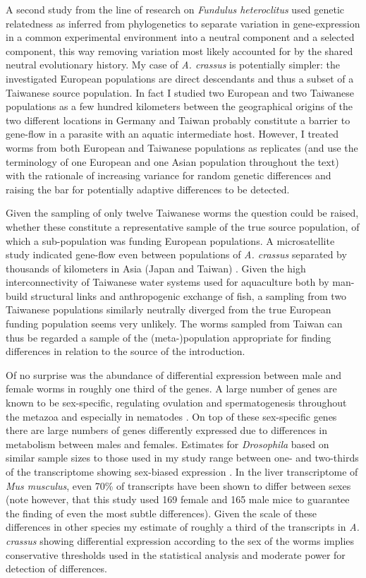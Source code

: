 A second study from the line of research on \textit{Fundulus
  heteroclitus} \cite{pmid16567645} used genetic relatedness as
inferred from phylogenetics to separate variation in gene-expression
in a common experimental environment into a neutral component and a
selected component, this way removing variation most likely accounted
for by the shared neutral evolutionary history. My case of
\textit{A. crassus} is potentially simpler: the investigated European
populations are direct descendants and thus a subset of a Taiwanese
source population. In fact I studied two European and two Taiwanese
populations as a few hundred kilometers between the geographical
origins of the two different locations in Germany and Taiwan probably
constitute a barrier to gene-flow in a parasite with an aquatic
intermediate host. However, I treated worms from both European and
Taiwanese populations as replicates (and use the terminology of one
European and one Asian population throughout the text) with the
rationale of increasing variance for random genetic differences and
raising the bar for potentially adaptive differences to be detected.

Given the sampling of only twelve Taiwanese worms the question could
be raised, whether these constitute a representative sample of the
true source population, of which a sub-population was funding European
populations. A microsatellite study indicated gene-flow even between
populations of \textit{A. crassus} separated by thousands of
kilometers in Asia (Japan and Taiwan)
\cite{wielgoss_population_2008}. Given the high interconnectivity of
Taiwanese water systems used for aquaculture both by man-build
structural links and anthropogenic exchange of fish, a sampling from
two Taiwanese populations similarly neutrally diverged from the true
European funding population seems very unlikely. The worms sampled
from Taiwan can thus be regarded a sample of the (meta-)population
appropriate for finding differences in relation to the source of the
introduction.

Of no surprise was the abundance of differential expression between
male and female worms in roughly one third of the genes. A large
number of genes are known to be sex-specific, regulating ovulation and
spermatogenesis throughout the metazoa and especially in nematodes
\cite{pmid15371532}. On top of these sex-specific genes there are
large numbers of genes differently expressed due to differences in
metabolism between males and females. Estimates for
\textit{Drosophila} based on similar sample sizes to those used in my
study range between one- and two-thirds of the transcriptome showing
sex-biased expression \cite{pmid11726925}. In the liver transcriptome
of \textit{Mus musculus}, even 70\% of transcripts have been shown to
differ between sexes \cite{pmid16825664} (note however, that this
study used 169 female and 165 male mice to guarantee the finding of
even the most subtle differences). Given the scale of these
differences in other species my estimate of roughly a third of the
transcripts in \textit{A. crassus} showing differential expression
according to the sex of the worms implies conservative thresholds used
in the statistical analysis and moderate power for detection of
differences.

